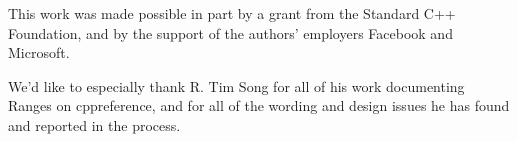 
This work was made possible in part by a grant from the Standard C++
Foundation, and by the support of the authors' employers Facebook and Microsoft.

We'd like to especially thank R. Tim Song for all of his work documenting Ranges
on cppreference, and for all of the wording and design issues he has found and
reported in the process.
